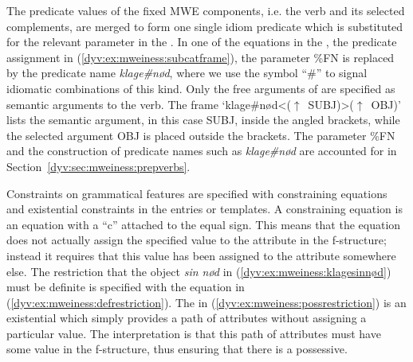 \documentclass[output=paper]{langsci/langscibook}
\begin{document}


The predicate values of the fixed MWE components, i.e. the verb and its selected complements, are merged to form one single idiom predicate which is substituted for the relevant parameter in the .
In one of the equations in the , the predicate assignment in (\ref{dyv:ex:mweiness:subcatframe}),  the parameter \%FN is replaced by the predicate name \emph{klage\#nød}, where we use the symbol ``\#'' to signal idiomatic combinations of this kind.
Only the free arguments of  are specified as semantic arguments to the verb.
The  frame `klage\#nød<($\uparrow$~SUBJ)>($\uparrow$~OBJ)' lists the semantic argument, in this case SUBJ, inside the angled brackets, while the selected argument OBJ is placed outside the brackets.
The parameter \%FN and the construction of predicate names such as \emph{klage\#nød} are accounted for in Section~\ref{dyv:sec:mweiness:prepverbs}.  


Constraints on grammatical features are specified with constraining equations and existential constraints in the entries or templates.
A constraining equation is an equation with a ``c'' attached to the equal sign.
This means that the equation does not actually assign the specified value to the attribute in the f-structure; instead it requires that this value has been assigned to the attribute somewhere else.
The restriction that the object \emph{sin nød} in (\ref{dyv:ex:mweiness:klagesinnød}) must be definite is specified with the equation in (\ref{dyv:ex:mweiness:defrestriction}).
The  in (\ref{dyv:ex:mweiness:possrestriction}) is an existential  which simply provides  a path of attributes without assigning a particular value.
The interpretation is that this path of attributes must have some value in the f-structure, thus ensuring that there is a possessive.
\end{document}
